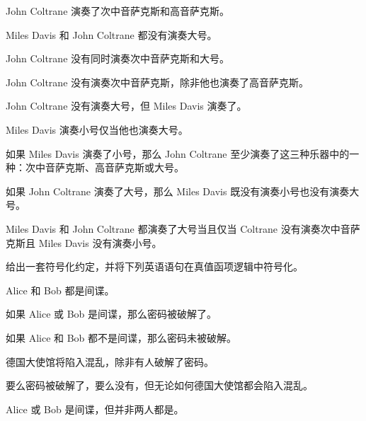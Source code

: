 \begin{compactlist}
\item John Coltrane 演奏了次中音萨克斯和高音萨克斯。%
\item Miles Davis 和 John Coltrane 都没有演奏大号。%
\item John Coltrane 没有同时演奏次中音萨克斯和大号。%
\item John Coltrane 没有演奏次中音萨克斯，除非他也演奏了高音萨克斯。%
\item John Coltrane 没有演奏大号，但 Miles Davis 演奏了。%
\item Miles Davis 演奏小号仅当他也演奏大号。%
\item 如果 Miles Davis 演奏了小号，那么 John Coltrane 至少演奏了这三种乐器中的一种：次中音萨克斯、高音萨克斯或大号。%
\item 如果 John Coltrane 演奏了大号，那么 Miles Davis 既没有演奏小号也没有演奏大号。%
\item Miles Davis 和 John Coltrane 都演奏了大号当且仅当 Coltrane 没有演奏次中音萨克斯且 Miles Davis 没有演奏小号。%
\end{compactlist}

\solutions
\problempart
\label{pr.spies}
给出一套符号化约定，并将下列英语语句在真值函项逻辑中符号化。

\begin{compactlist}
\item Alice 和 Bob 都是间谍。
\item 如果 Alice 或 Bob 是间谍，那么密码被破解了。
\item 如果 Alice 和 Bob 都不是间谍，那么密码未被破解。
\item 德国大使馆将陷入混乱，除非有人破解了密码。
\item 要么密码被破解了，要么没有，但无论如何德国大使馆都会陷入混乱。
\item Alice 或 Bob 是间谍，但并非两人都是。
\end{compactlist}

